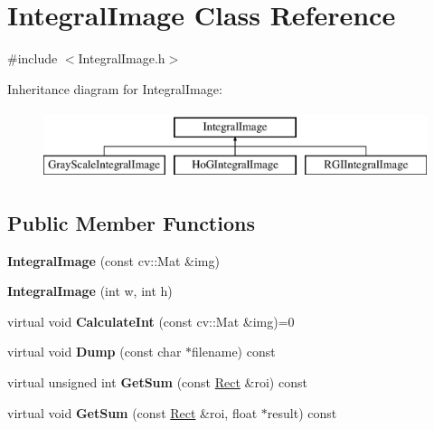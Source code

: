 \hypertarget{classIntegralImage}{}\section{Integral\+Image Class Reference}
\label{classIntegralImage}


{\ttfamily \#include $<$Integral\+Image.\+h$>$}

Inheritance diagram for Integral\+Image\+:\begin{figure}[H]
\begin{center}
\leavevmode
\includegraphics[height=2.000000cm]{classIntegralImage}
\end{center}
\end{figure}
\subsection*{Public Member Functions}
\begin{DoxyCompactItemize}
\item 
\hypertarget{classIntegralImage_a3cfe7e68c1e757de16b10c6a8d04bb0d}{}{\bfseries Integral\+Image} (const cv\+::\+Mat \&img)\label{classIntegralImage_a3cfe7e68c1e757de16b10c6a8d04bb0d}

\item 
\hypertarget{classIntegralImage_aee12d9b9aefddb1ea18c4bd0fa6dcbcc}{}{\bfseries Integral\+Image} (int w, int h)\label{classIntegralImage_aee12d9b9aefddb1ea18c4bd0fa6dcbcc}

\item 
\hypertarget{classIntegralImage_ae578410b9fca079c2274cfe1b0e45a12}{}virtual void {\bfseries Calculate\+Int} (const cv\+::\+Mat \&img)=0\label{classIntegralImage_ae578410b9fca079c2274cfe1b0e45a12}

\item 
\hypertarget{classIntegralImage_ab38ab2f824b81ef4e6ee0ba5745c806f}{}virtual void {\bfseries Dump} (const char $\ast$filename) const \label{classIntegralImage_ab38ab2f824b81ef4e6ee0ba5745c806f}

\item 
\hypertarget{classIntegralImage_a8e9c76dadb4a74863991f3ca32c4e33d}{}virtual unsigned int {\bfseries Get\+Sum} (const \hyperlink{classRect}{Rect} \&roi) const \label{classIntegralImage_a8e9c76dadb4a74863991f3ca32c4e33d}

\item 
\hypertarget{classIntegralImage_a339adc6f566e0c66dd2e0fca979e5308}{}virtual void {\bfseries Get\+Sum} (const \hyperlink{classRect}{Rect} \&roi, float $\ast$result) const \label{classIntegralImage_a339adc6f566e0c66dd2e0fca979e5308}

\end{DoxyCompactItemize}
